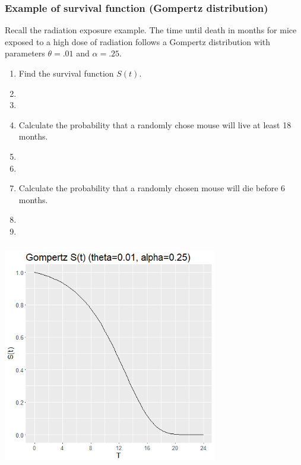 \begin{frame}
\frametitle{Example of survival function (Gompertz distribution)}
Recall the radiation exposure example. The time until death in months for mice exposed to a high dose of radiation follows a Gompertz distribution with parameters $\theta=.01$ and $\alpha = .25$.
\begin{enumerate}
\item Find the survival function $S(t)$.
\item[]
\item[]
\item Calculate the probability that a randomly chose mouse will live at least 18 months.
\item[]
\item[]
\item Calculate the probability that a randomly chosen mouse will die before 6 months.
\item[]
\item[]
\end{enumerate}
\end{frame}

\begin{frame}
\frametitle{}
\includegraphics[width=0.70\textwidth]{Figures/gompertzsurv.png}
\end{frame}

